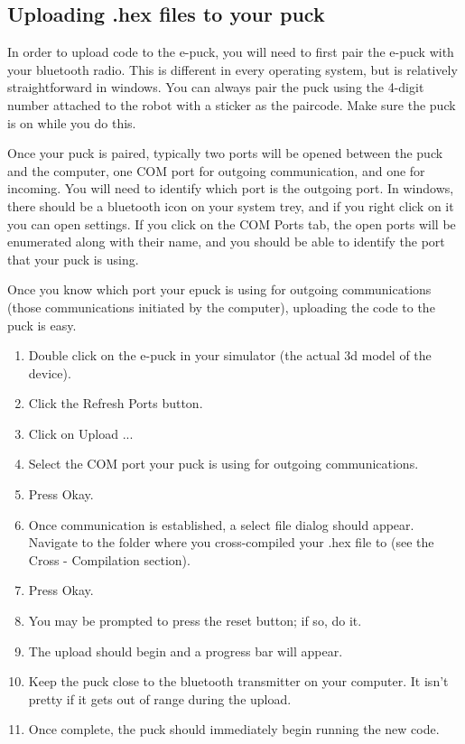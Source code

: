 \documentclass[11pt]{article} %
\begin{document}
\subsection{Uploading .hex files to your puck}

In order to upload code to the e-puck, you will need to first pair the e-puck with your bluetooth radio.  This is different in every operating system, but is relatively straightforward in windows.  You can always pair the puck using the 4-digit number attached to the robot with a sticker as the paircode.  Make sure the puck is on while you do this.

Once your puck is paired, typically two ports will be opened between the puck and the computer, one COM port for outgoing communication, and one for incoming.  You will need to identify which port is the outgoing port.  In windows, there should be a bluetooth icon on your system trey, and if you right click on it you can open settings.  If you click on the COM Ports tab, the open ports will be enumerated along with their name, and you should be able to identify the port that your puck is using.

Once you know which port your epuck is using for outgoing communications (those communications initiated by the computer), uploading the code to the puck is easy. 

\begin{enumerate}

	\item Double click on the e-puck in your simulator (the actual 3d model of the device).
	\item Click the Refresh Ports button.
	\item Click on Upload ...
	\item Select the COM port your puck is using for outgoing communications.
	\item Press Okay.
	\item Once communication is established, a select file dialog should appear.  Navigate to the folder where you cross-compiled your .hex file to (see the Cross - Compilation section).
	\item Press Okay.
	\item You may be prompted to press the reset button; if so, do it.
	\item The upload should begin and a progress bar will appear.
	\item Keep the puck close to the bluetooth transmitter on your computer.  It isn't pretty if it gets out of range during the upload.
	\item Once complete, the puck should immediately begin running the new code.

\end{enumerate}
\end{document}
